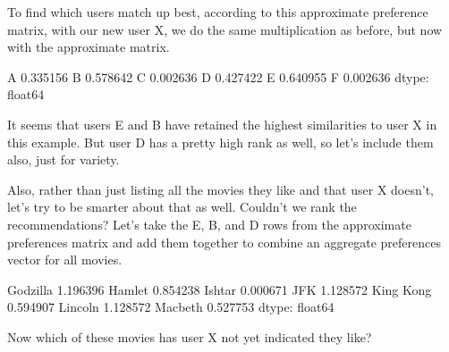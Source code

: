 \documentclass[letterpaper,10pt,english]{sphinxmanual}
\begin{document}
To find which users match up best, according to this approximate preference matrix, with our new user X, we do the same multiplication as before, but now with the approximate matrix.

\begin{sphinxVerbatim}[commandchars=\\\{\}]
  
\end{sphinxVerbatim}

\begin{sphinxVerbatim}[commandchars=\\\{\}]
A    0.335156
B    0.578642
C   \PYGZhy{}0.002636
D    0.427422
E    0.640955
F   \PYGZhy{}0.002636
dtype: float64
\end{sphinxVerbatim}

It seems that users E and B have retained the highest similarities to user X in this example.  But user D has a pretty high rank as well, so let’s include them also, just for variety.

Also, rather than just listing all the movies they like and that user X doesn’t, let’s try to be smarter about that as well.  Couldn’t we rank the recommendations?  Let’s take the E, B, and D rows from the approximate preferences matrix and add them together to combine an aggregate preferences vector for all movies.

\begin{sphinxVerbatim}[commandchars=\\\{\}]
  \PYG{p}{[}\PYG{p}{[}\PYG{p}{]}\PYG{p}{]}
  
\end{sphinxVerbatim}

\begin{sphinxVerbatim}[commandchars=\\\{\}]
Godzilla     1.196396
Hamlet       0.854238
Ishtar      \PYGZhy{}0.000671
JFK          1.128572
King Kong    0.594907
Lincoln      1.128572
Macbeth      0.527753
dtype: float64
\end{sphinxVerbatim}

Now which of these movies has user X not yet indicated they like?
\end{document}
